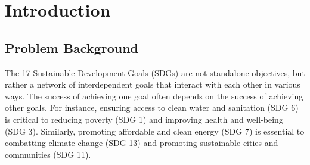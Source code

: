 \section{Introduction}
\subsection{Problem Background}

\begin{comment}
伴随着人类的发展，我们的生活水平和生活质量不断提高，但是在我们这个广大的世界之中，我们依然面临了诸多问题。联合国组织总结出了17个可持续发展的核心目标，这些问题有着不同的侧重点，但是他们都是我们最为重要的议题


联合国发展到今天，我们面临了许多问题这些问题有大有小，我们需要解决。
但同时，有一些问题伴随了人类历史这么多年，需要我们着重进行考虑。这些问题概括了人类历史发展的诸多问题挑战。他们有17个，我们称之为17个可持续发展问题。、
这些可持续发展问题有：
目标1:无贫困\\
目标2:零饥饿\\
目标3:良好的健康和福祉\\
目标4:优质教育\\
目标5:性别平等\\
目标6:清洁水和卫生\\
目标7:负担得起的清洁能源\\
目标8:体面的工作和经济增长\\
目标9:工业、创新和基础设施\\
目标10:减少不平等\\
目标11:可持续的城市和社区\\
目标12:负责任的消费和生产\\
目标13:气候行动\\
目标14:水下生命\\
目标15: 陆地生物\\
目标16:和平与正义强大的机构\\
目标17:实现目标的伙伴关系\\

如此之多的目标问题，我们需要进行分析，以便得到最终的解决方案，来让人类社会变得更加美好。
\end{comment}


The 17 Sustainable Development Goals (SDGs) are not standalone objectives, but rather a network of interdependent goals that interact with each other in various ways. The success of achieving one goal often depends on the success of achieving other goals. For instance, ensuring access to clean water and sanitation (SDG 6) is critical to reducing poverty (SDG 1) and improving health and well-being (SDG 3). Similarly, promoting affordable and clean energy (SDG 7) is essential to combatting climate change (SDG 13) and promoting sustainable cities and communities (SDG 11).

